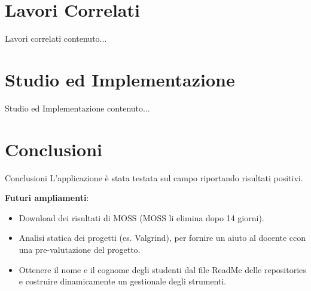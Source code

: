 \documentclass{beamer}
\begin{document}
	\section{Lavori Correlati}
	
	\begin{frame}{Lavori correlati}
		contenuto...
	\end{frame}
	
	\section{Studio ed Implementazione}
	
	\begin{frame}{Studio ed Implementazione}
		contenuto...
	\end{frame}
	
	\section{Conclusioni}

%


	
	\begin{frame}{Conclusioni}
		L'applicazione è stata testata sul campo riportando risultati positivi.
		
		\vspace{0.5cm}
		\textbf{Futuri ampliamenti}:
		\begin{itemize}
			\item Download dei risultati di MOSS (MOSS li elimina dopo 14 giorni).
			\item Analisi statica dei progetti (es. Valgrind), per fornire un aiuto al docente ccon una pre-valutazione del progetto.
			\item Ottenere il nome e il cognome degli studenti dal file ReadMe delle repositories e costruire dinamicamente un gestionale degli strumenti.
		\end{itemize}
	\end{frame}
\end{document}
